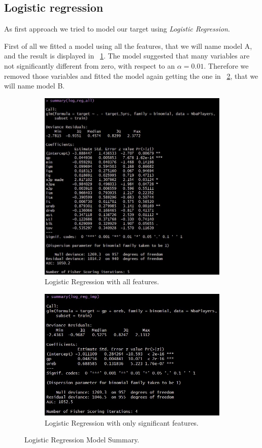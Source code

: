 \subsection{Logistic regression}

As first approach we tried to model our target using \textit{Logistic Regression}.

First of all we fitted a model using all the features, that we will name model A, and the result is displayed in \Fig~\ref{fig:LRAllSum}. The model suggested that many variables are not significantly different from zero, with respect to an $\alpha = 0.01$. Therefore we removed those variables and fitted the model again getting the one in \Fig~\ref{fig:LRImpSum}, that we will name model B.

\begin{figure}[h]
	\begin{subfigure}{.6\textwidth}
		\centering
		\includegraphics[width=0.7\linewidth]{ImageFiles/Classification/LogReg/log_reg_tt_all_summary}
		\caption{Logistic Regression with all features.}
		\label{fig:LRAllSum}
	\end{subfigure}
	\begin{subfigure}{.6\textwidth}
		\centering
		\includegraphics[width=0.8\linewidth]{ImageFiles/Classification/LogReg/log_reg_tt_imp_summary}
		\caption{Logistic Regression with only significant features.}
		\label{fig:LRImpSum}
	\end{subfigure}
	\caption{Logistic Regression Model Summary.}
	\label{fig:LRSum}
\end{figure}

